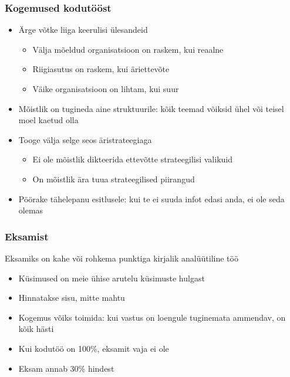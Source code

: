 \begin{frame}[fragile]
  \frametitle{Kogemused kodutööst}
  	\begin{itemize}
		\item Ärge võtke liiga keerulisi ülesandeid
		\begin{itemize}
			\item Välja mõeldud organisatsioon on raskem, kui reaalne
			\item Riigiasutus on raskem, kui äriettevõte
			\item Väike organisatsioon on lihtam, kui suur
		\end{itemize}
		\item Mõistlik on tugineda aine struktuurile: kõik teemad võiksid ühel või teisel moel kaetud olla
		\item Tooge välja selge seos äristrateegiaga
		\begin{itemize}
			\item Ei ole mõistlik dikteerida ettevõtte strateegilisi valikuid
			\item On mõistlik ära tuua strateegilised piirangud
		\end{itemize}
		\item Pöörake tähelepanu esitlusele: kui te ei suuda infot edasi anda, ei ole seda olemas
	\end{itemize}
\end{frame}


\begin{frame}[fragile]
  \frametitle{Eksamist}
  Eksamiks on kahe või rohkema punktiga kirjalik analüütiline töö
  	\begin{itemize}	
		\item Küsimused on meie ühise arutelu küsimuste hulgast
		\item Hinnatakse sisu, mitte mahtu
		\item Kogemus võiks toimida: kui vastus on loengule tuginemata ammendav, on kõik hästi
		\item Kui kodutöö on 100\%, eksamit vaja ei ole
		\item Eksam annab 30\% hindest
	\end{itemize}
\end{frame}

